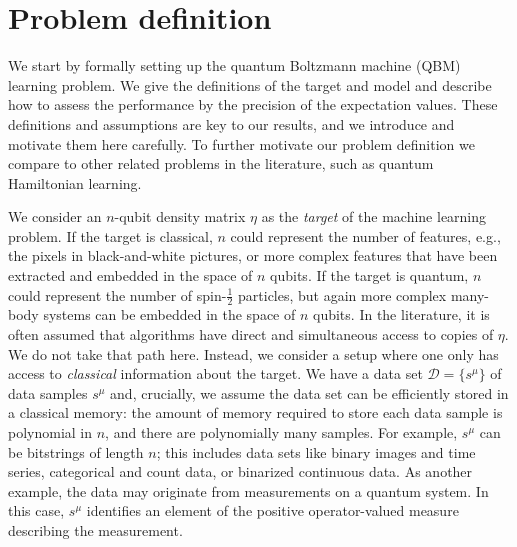 \documentclass[
    aps,
    prx,
    onecolumn
]{revtex4-2}
\begin{document}
\section*{Problem definition}

We start by formally setting up the quantum Boltzmann machine (QBM) learning problem. We give the definitions of the target and model and describe how to assess the performance by the precision of the expectation values. These definitions and assumptions are key to our results, and we introduce and motivate them here carefully. To further motivate our problem definition we compare to other related problems in the literature, such as quantum Hamiltonian learning.  

We consider an $n$-qubit density matrix $\eta$ as the \emph{target} of the machine learning problem. If the target is classical, $n$ could represent the number of features, e.g., the pixels in black-and-white pictures, or more complex features that have been extracted and embedded in the space of $n$ qubits. If the target is quantum, $n$ could represent the number of  spin-$\tfrac{1}{2}$ particles, but again more complex many-body systems can be embedded in the space of $n$ qubits. In the literature, it is often assumed that algorithms have direct and simultaneous access to copies of $\eta$. We do not take that path here. Instead, we consider a setup where one only has access to \emph{classical} information about the target. We have a data set $\mathcal{D} = \{s^\mu\}$ of data samples $s^\mu$ and, crucially, we assume the data set can be efficiently stored in a classical memory: the amount of memory required to store each data sample is polynomial in $n$, and there are polynomially many samples. For example, $s^\mu$ can be bitstrings of length $n$; this includes data sets like binary images and time series, categorical and count data, or binarized continuous data. As another example, the data may originate from measurements on a quantum system. In this case, $s^\mu$ identifies an element of the positive operator-valued measure describing the measurement. 
\end{document}
